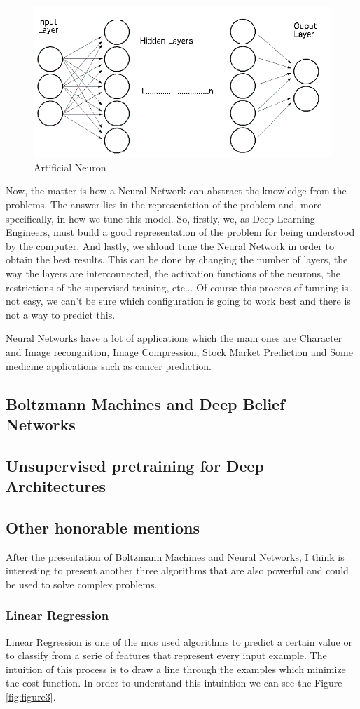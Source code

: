 \documentclass[12pt]{article}
\begin{document}
\begin{figure}[ht]
\centering
\includegraphics[width=.4\textwidth]{network.png}
\caption{Artificial Neuron}
\label{fig:figure2}
\end{figure}

Now, the matter is how a Neural Network can abstract the knowledge from the problems. The answer lies in the representation of the problem and, more specifically, in how we tune this model. So, firstly, we, as Deep Learning Engineers, must build a good representation of the problem for being understood by the computer. And lastly, we shloud tune the Neural Network in order to obtain the best results. This can be done by changing the number of layers, the way the layers are interconnected, the activation functions of the neurons, the restrictions of the supervised training, etc... Of course this procces of tunning is not easy, we can't be sure which configuration is going to work best and there is not a way to predict this.

Neural Networks have a lot of applications which the main ones are Character and Image recongnition, Image Compression, Stock Market Prediction and Some medicine applications such as cancer prediction.
\subsection{Boltzmann Machines and Deep Belief Networks\cite{bengio2009learning}}

\subsection{Unsupervised pretraining for Deep Architectures\cite{erhan2010does,bengio2007greedy}}

\subsection{Other honorable mentions}
After the presentation of Boltzmann Machines and Neural Networks, I think is interesting to present another three algorithms that are also powerful and could be used to solve complex problems.

\subsubsection{Linear Regression}
Linear Regression is one of the mos used algorithms to predict a certain value or to classify from a serie of features that represent every input example. The intuition of this process is to draw a line through the examples which minimize the cost function. In order to understand this intuintion we can see the Figure \ref{fig:figure3}.
\end{document}
